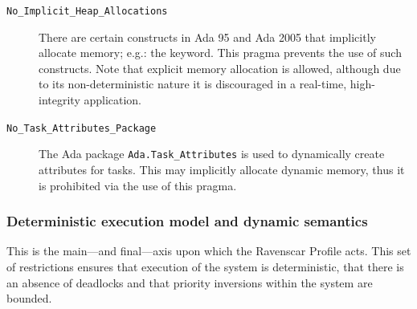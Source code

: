 \begin{description}
\item[\texttt{No\_Implicit\_Heap\_Allocations}] There are certain
constructs in Ada 95 and Ada 2005 that implicitly allocate memory;
e.g.: the  keyword. This pragma prevents the use of such
constructs. Note that explicit memory allocation is allowed, although
due to its non-deterministic nature it is discouraged in a real-time,
high-integrity application.

\item[\texttt{No\_Task\_Attributes\_Package}] The Ada package
\texttt{Ada.Task\_Attributes} is used to dynamically create attributes
for tasks. This may implicitly allocate dynamic memory, thus it is
prohibited via the use of this pragma.
\end{description}

\subsubsection{Deterministic execution model and dynamic semantics}
This is the main---and final---axis upon which the Ravenscar Profile
acts. This set of restrictions ensures that execution of the system is
deterministic, that there is an absence of deadlocks and that priority
inversions within the system are bounded.

